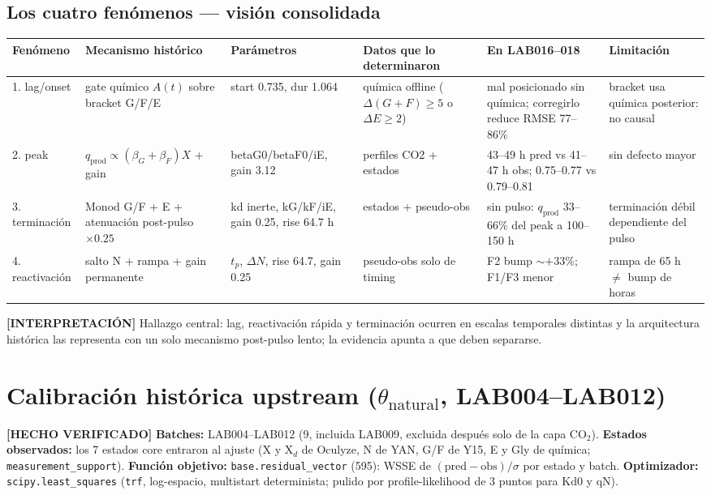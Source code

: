 \documentclass[11pt,a4paper]{article}
\newcommand{\hecho}{\textcolor{hecho}{\textbf{[HECHO VERIFICADO]}}}
\newcommand{\interp}{\textcolor{interp}{\textbf{[INTERPRETACI\'ON]}}}
\newcommand{\ruta}[1]{\texttt{\small #1}}
\begin{document}
\subsection{Los cuatro fen\'omenos --- visi\'on consolidada}
\begin{table}[h]\centering\footnotesize
\begin{tabularx}{\textwidth}{P{1.7cm}P{3.1cm}P{2.3cm}P{2.6cm}P{3.3cm}P{3.0cm}}
\toprule
Fen\'omeno & Mecanismo hist\'orico & Par\'ametros & Datos que lo determinaron & En LAB016--018 & Limitaci\'on \\
. lag/onset & gate qu\'imico $A(t)$ sobre bracket G/F/E & start 0.735, dur 1.064 & qu\'imica offline ($\Delta(G{+}F)\!\ge\!5$ o $\Delta E\!\ge\!2$) & mal posicionado sin qu\'imica; corregirlo reduce RMSE 77--86\% & bracket usa qu\'imica posterior: no causal \\
2. peak & $q_{\mathrm{prod}} \propto (\beta_G{+}\beta_F)X$ + gain & betaG0/betaF0/iE, gain 3.12 & perfiles CO2 + estados & 43--49 h pred vs 41--47 h obs; 0.75--0.77 vs 0.79--0.81 & sin defecto mayor \\
3. terminaci\'on & Monod G/F + E + atenuaci\'on post-pulso $\times 0.25$ & kd inerte, kG/kF/iE, gain 0.25, rise 64.7 h & estados + pseudo-obs & sin pulso: $q_{\mathrm{prod}}$ 33--66\% del peak a 100--150 h & terminaci\'on d\'ebil dependiente del pulso \\
4. reactivaci\'on & salto N + rampa + gain permanente & $t_p$, $\Delta N$, rise 64.7, gain 0.25 & pseudo-obs solo de timing & F2 bump ${\sim}{+}33\%$; F1/F3 menor & rampa de 65 h $\ne$ bump de horas \\
\bottomrule
\end{tabularx}
\end{table}

\interp{} Hallazgo central: lag, reactivaci\'on r\'apida y terminaci\'on ocurren en escalas temporales distintas y la arquitectura hist\'orica las representa con un solo mecanismo post-pulso lento; la evidencia apunta a que deben separarse.

\section{Calibraci\'on hist\'orica upstream ($\theta_{\mathrm{natural}}$, LAB004--LAB012)}

\hecho{} \textbf{Batches:} LAB004--LAB012 (9, incluida LAB009, excluida despu\'es solo de la capa CO$_2$). \textbf{Estados observados:} los 7 estados core entraron al ajuste (X y X$_d$ de Oculyze, N de YAN, G/F de Y15, E y Gly de qu\'imica; \ruta{measurement\_support}). \textbf{Funci\'on objetivo:} \ruta{base.residual\_vector} (595): WSSE de $(\mathrm{pred}-\mathrm{obs})/\sigma$ por estado y batch. \textbf{Optimizador:} \ruta{scipy.least\_squares} (\ruta{trf}, log-espacio, multistart determinista; pulido por profile-likelihood de 3 puntos para Kd0 y qN).
\end{document}
